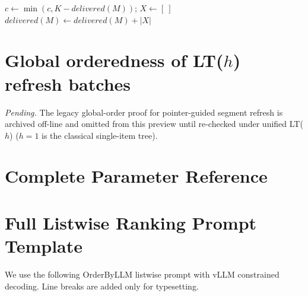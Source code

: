 \begin{algorithm}[t]
\small
\caption{$\textsc{Next}(M,c)$ for a Loser-Tree Producer}
\label{alg:pipelined_lt_next}

$c\gets\min(c,K-\mathit{delivered}(M))$; $X\gets[\ ]$\;
$\mathit{delivered}(M)\gets\mathit{delivered}(M)+|X|$\;
\;
\end{algorithm}


\section{Global orderedness of LT($h$) refresh batches}
\label{sec:appendix-segment-correctness}
\noindent\textit{Pending.} The legacy global-order proof for pointer-guided segment refresh is archived off-line and omitted from this preview until re-checked under unified LT($h$) (\(h{=}1\) is the classical single-item tree).

\section{Complete Parameter Reference}
\label{sec:parameter-reference}



\section{Full Listwise Ranking Prompt Template}
\label{sec:appendix-listwise-prompt}

We use the following OrderByLLM listwise prompt with vLLM constrained decoding.  Line breaks are added only for typesetting.


